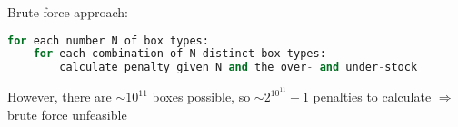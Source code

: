 \begin{frame}
Brute force approach:
\begin{lstlisting}[language=Python]
for each number N of box types:
	for each combination of N distinct box types:
		calculate penalty given N and the over- and under-stock
\end{lstlisting}
However, there are $\sim 10^{11}$ boxes possible, so $\sim 2^{10^{11}} - 1$ penalties to calculate $\Rightarrow$ brute force unfeasible
\end{frame}

